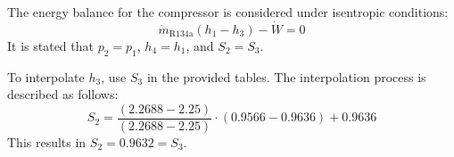 The energy balance for the compressor is considered under isentropic conditions:  
\[
\dot{m}_{\text{R134a}} (h_1 - h_3) - \dot{W} = 0
\]  
It is stated that \( p_2 = p_1 \), \( h_4 = h_1 \), and \( S_2 = S_3 \).  

To interpolate \( h_3 \), use \( S_3 \) in the provided tables. The interpolation process is described as follows:  
\[
S_2 = \frac{(2.2688 - 2.25)}{(2.2688 - 2.25)} \cdot (0.9566 - 0.9636) + 0.9636
\]  
This results in \( S_2 = 0.9632 = S_3 \).